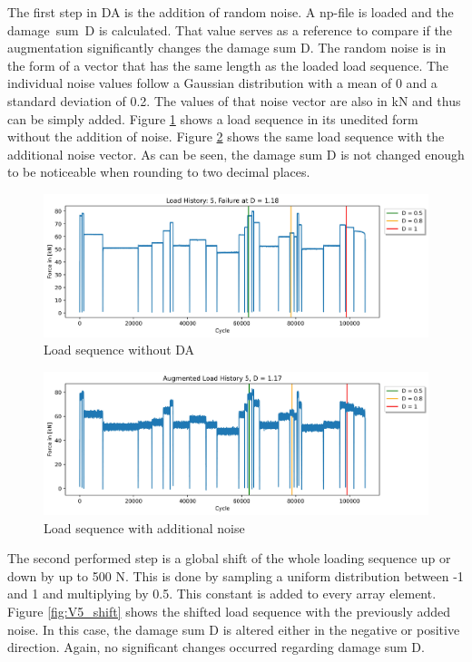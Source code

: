 The first step in DA is the addition of random noise. A np-file is loaded and the damage~sum~D is calculated. That value serves as a reference to compare if the augmentation significantly changes the damage sum D.
The random noise is in the form of a vector that has the same length as the loaded load sequence.
The individual noise values follow a Gaussian distribution with a mean of 0 and a standard deviation of 0.2. 
The values of that noise vector are also in kN and thus can be simply added.
Figure \ref{fig:V5} shows a load sequence in its unedited form without the addition of noise. Figure \ref{fig:V5_noise} shows the same load sequence with the additional noise vector. As can be seen, the damage sum D is not changed enough to be noticeable when rounding to two decimal places. 

\begin{figure}[H]
	\centering
	\includegraphics[width=1\linewidth]{IMGs/Verlauf_5.jpg}
	\caption{Load sequence without DA}
	\label{fig:V5}
\end{figure}

\begin{figure}[H]
	\centering
	\includegraphics[width=1\linewidth]{IMGs/Verlauf_5_noise.jpg}
	\caption{Load sequence with additional noise}
	\label{fig:V5_noise}
\end{figure}

The second performed step is a global shift of the whole loading sequence up or down by up to 500 N. This is done by sampling a uniform distribution between -1 and 1 and multiplying by 0.5. This constant is added to every array element. Figure \ref{fig:V5_shift} shows the shifted load sequence with the previously added noise. In this case, the damage sum D is altered either in the negative or positive direction. Again, no significant changes occurred regarding damage sum D.


